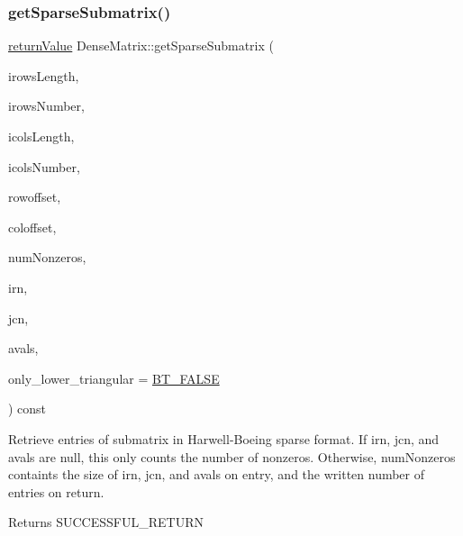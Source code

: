 \subsubsection{\texorpdfstring{get\+Sparse\+Submatrix()}{getSparseSubmatrix()}}
{\footnotesize\ttfamily \hyperlink{_message_handling_8hpp_a81d556f613bfbabd0b1f9488c0fa865e}{return\+Value} Dense\+Matrix\+::get\+Sparse\+Submatrix (\begin{DoxyParamCaption}\item[{\hyperlink{_types_8hpp_ab6fd6105e64ed14a0c9281326f05e623}{int\+\_\+t}}]{irows\+Length,  }\item[{const \hyperlink{_types_8hpp_ab6fd6105e64ed14a0c9281326f05e623}{int\+\_\+t} $\ast$const}]{irows\+Number,  }\item[{\hyperlink{_types_8hpp_ab6fd6105e64ed14a0c9281326f05e623}{int\+\_\+t}}]{icols\+Length,  }\item[{const \hyperlink{_types_8hpp_ab6fd6105e64ed14a0c9281326f05e623}{int\+\_\+t} $\ast$const}]{icols\+Number,  }\item[{\hyperlink{_types_8hpp_ab6fd6105e64ed14a0c9281326f05e623}{int\+\_\+t}}]{rowoffset,  }\item[{\hyperlink{_types_8hpp_ab6fd6105e64ed14a0c9281326f05e623}{int\+\_\+t}}]{coloffset,  }\item[{\hyperlink{_types_8hpp_ab6fd6105e64ed14a0c9281326f05e623}{int\+\_\+t} \&}]{num\+Nonzeros,  }\item[{\hyperlink{_types_8hpp_ab6fd6105e64ed14a0c9281326f05e623}{int\+\_\+t} $\ast$}]{irn,  }\item[{\hyperlink{_types_8hpp_ab6fd6105e64ed14a0c9281326f05e623}{int\+\_\+t} $\ast$}]{jcn,  }\item[{\hyperlink{qp_o_a_s_e_s__wrapper_8h_a0d00e2b3dfadee81331bbb39068570c4}{real\+\_\+t} $\ast$}]{avals,  }\item[{\hyperlink{_types_8hpp_a20f82124c82b6f5686a7fce454ef9089}{Boolean\+Type}}]{only\+\_\+lower\+\_\+triangular = {\ttfamily \hyperlink{_types_8hpp_a20f82124c82b6f5686a7fce454ef9089a85b8a20e72a8bea5dd10a6007fe3071e}{B\+T\+\_\+\+F\+A\+L\+SE}} }\end{DoxyParamCaption}) const\hspace{0.3cm}{\ttfamily [virtual]}}

Retrieve entries of submatrix in Harwell-\/\+Boeing sparse format. If irn, jcn, and avals are null, this only counts the number of nonzeros. Otherwise, num\+Nonzeros containts the size of irn, jcn, and avals on entry, and the written number of entries on return. \begin{DoxyReturn}{Returns}
S\+U\+C\+C\+E\+S\+S\+F\+U\+L\+\_\+\+R\+E\+T\+U\+RN 
\end{DoxyReturn}

